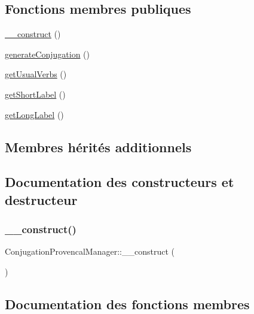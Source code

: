 \subsection*{Fonctions membres publiques}
\begin{DoxyCompactItemize}
\item 
\hyperlink{class_conjugation_provencal_manager_a49bb818f286f28cc3c860ea5958feb68}{\+\_\+\+\_\+construct} ()
\item 
\hyperlink{class_conjugation_provencal_manager_ab63e44b281c68e841becec69bf3abf5d}{generate\+Conjugation} ()
\item 
\hyperlink{class_conjugation_provencal_manager_ab54b1aaa7e39d3f31d416640322eae5a}{get\+Usual\+Verbs} ()
\item 
\hyperlink{class_conjugation_provencal_manager_acfdf3d08b4e9787cd9fac2e9eea042ba}{get\+Short\+Label} ()
\item 
\hyperlink{class_conjugation_provencal_manager_a9795549adf0ba2f9bded882cf85c792c}{get\+Long\+Label} ()
\end{DoxyCompactItemize}
\subsection*{Membres hérités additionnels}


\subsection{Documentation des constructeurs et destructeur}
\hypertarget{class_conjugation_provencal_manager_a49bb818f286f28cc3c860ea5958feb68}{}\label{class_conjugation_provencal_manager_a49bb818f286f28cc3c860ea5958feb68} 
\subsubsection{\texorpdfstring{\+\_\+\+\_\+construct()}{\_\_construct()}}
{\footnotesize\ttfamily Conjugation\+Provencal\+Manager\+::\+\_\+\+\_\+construct (\begin{DoxyParamCaption}{ }\end{DoxyParamCaption})}



\subsection{Documentation des fonctions membres}
\hypertarget{class_conjugation_provencal_manager_ab63e44b281c68e841becec69bf3abf5d}{}\label{class_conjugation_provencal_manager_ab63e44b281c68e841becec69bf3abf5d} 

